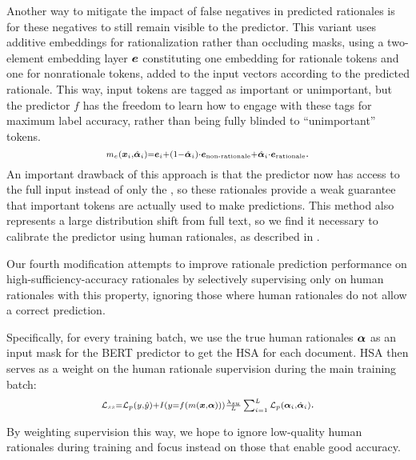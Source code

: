 Another way to mitigate the impact of false negatives in predicted rationales is for these negatives to still remain visible to the predictor. This variant uses additive embeddings for rationalization rather than occluding masks,
using a two-element embedding layer $\bm{e}$ constituting one embedding for rationale tokens and one for nonrationale tokens, added to the input vectors according to the predicted rationale. This way, input tokens are tagged as important or unimportant, but the predictor $f$ has the freedom to learn how to engage with these tags for maximum label accuracy, rather than being fully blinded to ``unimportant'' tokens. 
\begingroup\abovedisplayskip=4pt \belowdisplayskip=4pt
$${\scriptstyle m_e(\bm{x}_i,\hat{\bm{\alpha}}_i) = \bm{e}_i + (1-\hat{\bm{\alpha}}_i) \cdot \bm{e}_{\operatorname{non-rationale}} + \hat{\bm{\alpha}}_i\cdot \bm{e}_{\operatorname{rationale}}}.$$
\endgroup
An important drawback of this approach is that the predictor now has access to the full input instead of only the \rationalizedinput, so these rationales provide a weak guarantee that important tokens are actually used to make predictions. This method also represents a large distribution shift from full text, so we find it necessary to calibrate the predictor using human rationales, as described in . 

Our fourth modification attempts to improve rationale prediction performance on high-sufficiency-accuracy rationales by selectively supervising only on human rationales with this property, ignoring those where human rationales do not allow a correct prediction. 

Specifically, for every training batch, we use the true human rationales $\bm{\alpha}$ as an input mask for the BERT predictor to get the HSA for each document.
HSA then serves as a weight on the human rationale supervision during the main training batch: 
\begingroup\abovedisplayskip=4pt \belowdisplayskip=4pt
$${\scriptstyle \mathcal{L}_{ss}=\mathcal{L}_p(y,\hat{y}) + I(y = f(m(\bm{x}, \bm{\alpha})))\frac{\lambda_{su}}{L}\sum_{i=1}^L \mathcal{L}_p(\bm{\alpha}_i, \hat{\bm{\alpha}}_i)}.$$
\endgroup

By weighting supervision this way, we hope to ignore 
low-quality
human rationales during training and focus instead on those that enable good accuracy. 
